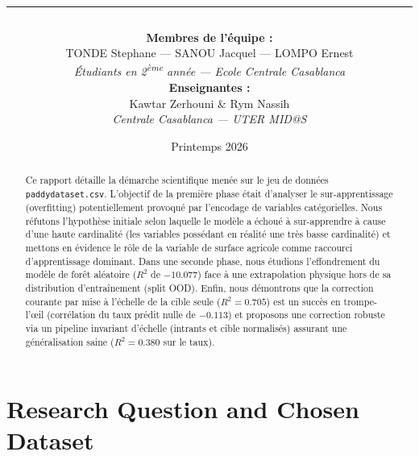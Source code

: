 \documentclass[11pt,a4paper]{article}
\title{
    \vspace{-2cm}
    \fontsize{22}{26}\selectfont\bfseries\color{primary}{Projet : When Machine Learning Fails}\\
    \fontsize{14}{18}\selectfont\color{secondary}{Analyse approfondie des pannes : Raccourcis d'apprentissage, limites d'extrapolation et illusions de correction}\\
    \vspace{0.5cm}
    \rule{\linewidth}{1.5pt}
}
\author{
    \textbf{Membres de l'équipe :}\\[0.3cm]
    TONDE Stephane \quad --- \quad SANOU Jacquel \quad --- \quad LOMPO Ernest\\[0.3cm]
    \textit{Étudiants en 2\textsuperscript{ème} année --- Ecole Centrale Casablanca}\\[0.5cm]
    \textbf{Enseignantes :} \\
    Kawtar Zerhouni \& Rym Nassih\\
    \textit{Centrale Casablanca --- UTER MID@S}
}
\date{Printemps 2026}
\begin{document}
\maketitle
\vspace{1cm}

\begin{abstract}
Ce rapport détaille la démarche scientifique menée sur le jeu de données \texttt{paddydataset.csv}. L'objectif de la première phase était d'analyser le sur-apprentissage (overfitting) potentiellement provoqué par l'encodage de variables catégorielles. Nous réfutons l'hypothèse initiale selon laquelle le modèle a échoué à sur-apprendre à cause d'une haute cardinalité (les variables possédant en réalité une très basse cardinalité) et mettons en évidence le rôle de la variable de surface agricole comme raccourci d'apprentissage dominant. Dans une seconde phase, nous étudions l'effondrement du modèle de forêt aléatoire ($R^2$ de $-10.077$) face à une extrapolation physique hors de sa distribution d'entraînement (split OOD). Enfin, nous démontrons que la correction courante par mise à l'échelle de la cible seule ($R^2 = 0.705$) est un succès en trompe-l'œil (corrélation du taux prédit nulle de $-0.113$) et proposons une correction robuste via un pipeline invariant d'échelle (intrants et cible normalisés) assurant une généralisation saine ($R^2 = 0.380$ sur le taux).
\end{abstract}

\newpage

\section{Research Question and Chosen Dataset}
\end{document}
